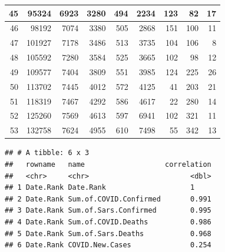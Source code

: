 \documentclass[
]{article}
\newenvironment{Shaded}{\begin{snugshade}}{\end{snugshade}}
\newcommand{\DataTypeTok}[1]{\textcolor[rgb]{0.13,0.29,0.53}{#1}}
\newcommand{\DecValTok}[1]{\textcolor[rgb]{0.00,0.00,0.81}{#1}}
\newcommand{\KeywordTok}[1]{\textcolor[rgb]{0.13,0.29,0.53}{\textbf{#1}}}
\newcommand{\NormalTok}[1]{#1}
\newcommand{\OperatorTok}[1]{\textcolor[rgb]{0.81,0.36,0.00}{\textbf{#1}}}
\newcommand{\StringTok}[1]{\textcolor[rgb]{0.31,0.60,0.02}{#1}}
\begin{document}
\begin{table}[H]
\begin{tabular}{r|r|r|r|r|r|r|r|r}
\hline
45 & 95324 & 6923 & 3280 & 494 & 2234 & 123 & 82 & 17\\
\hline
46 & 98192 & 7074 & 3380 & 505 & 2868 & 151 & 100 & 11\\
\hline
47 & 101927 & 7178 & 3486 & 513 & 3735 & 104 & 106 & 8\\
\hline
48 & 105592 & 7280 & 3584 & 525 & 3665 & 102 & 98 & 12\\
\hline
49 & 109577 & 7404 & 3809 & 551 & 3985 & 124 & 225 & 26\\
\hline
50 & 113702 & 7445 & 4012 & 572 & 4125 & 41 & 203 & 21\\
\hline
51 & 118319 & 7467 & 4292 & 586 & 4617 & 22 & 280 & 14\\
\hline
52 & 125260 & 7569 & 4613 & 597 & 6941 & 102 & 321 & 11\\
\hline
53 & 132758 & 7624 & 4955 & 610 & 7498 & 55 & 342 & 13\\
\hline
\end{tabular}
\end{table}

\begin{Shaded}
\end{Shaded}

\begin{verbatim}
## # A tibble: 6 x 3
##   rowname   name                   correlation
##   <chr>     <chr>                        <dbl>
## 1 Date.Rank Date.Rank                    1    
## 2 Date.Rank Sum.of.COVID.Confirmed       0.991
## 3 Date.Rank Sum.of.Sars.Confirmed        0.995
## 4 Date.Rank Sum.of.COVID.Deaths          0.986
## 5 Date.Rank Sum.of.Sars.Deaths           0.968
## 6 Date.Rank COVID.New.Cases              0.254
\end{verbatim}
\end{document}
